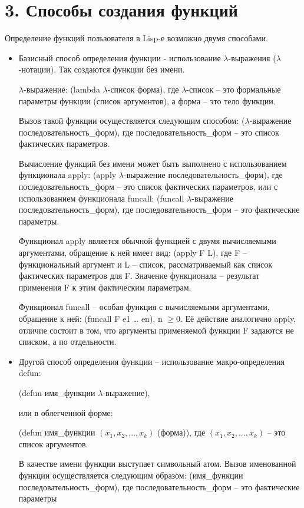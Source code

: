 \documentclass[12pt]{report}
\begin{document}
\section*{3. Способы создания функций}

Определение функций пользователя в Lisp-е возможно двумя способами.


\begin{itemize}
	\item Базисный способ  определения  функции - использование $\lambda$-выражения ($\lambda$-нотации). Так создаются функции без имени.
	
	$\lambda$-выражение: (lambda $\lambda$-список форма), 
	где $\lambda$-список --  это формальные параметры функции (список аргументов), а форма -- это тело функции.
	
	Вызов такой функции осуществляется следующим способом: ($\lambda$-выражение последовательность\_форм), 
	где последовательность\_форм -- это список фактических параметров.
	
	Вычисление функций без имени может быть выполнено с использованием функционала apply: (apply $\lambda$-выражение последовательность\_форм), где последовательность\_форм -- это список фактических параметров, или с использованием функционала funcall: (funcall $\lambda$-выражение последовательность\_форм), где последовательность\_форм -- это фактические параметры.
	
	Функционал apply является обычной функцией с двумя  вычисляемыми аргументами, обращение к ней имеет вид: (apply F L), где F – функциональный аргумент и L -- список, рассматриваемый как список фактических параметров для F. Значение функционала -- результат применения F к этим фактическим параметрам.
	
	Функционал funcall – особая функция с вычисляемыми аргументами, обращение к ней: (funcall F e1 … en), n $\geqslant 0$. Её   действие аналогично apply, отличие состоит в том, что аргументы  применяемой функции F задаются не списком, а по отдельности. 
	
	\item Другой способ определения функции -- использование макро-определения defun: 
	
	(defun имя\_функции $\lambda$-выражение), 
	
	или  в облегченной форме:
	
	(defun имя\_функции $(x_1, x_2, ..., x_k)$ (форма)), 
	где $(x_1, x_2, ..., x_k)$ -- это  список аргументов.
	
	В качестве имени функции выступает символьный атом. 
	Вызов именованной функции осуществляется следующим образом: (имя\_функции последовательность\_форм), 
	где последовательность\_форм -- это фактические параметры
	
\end{itemize}
\end{document}
